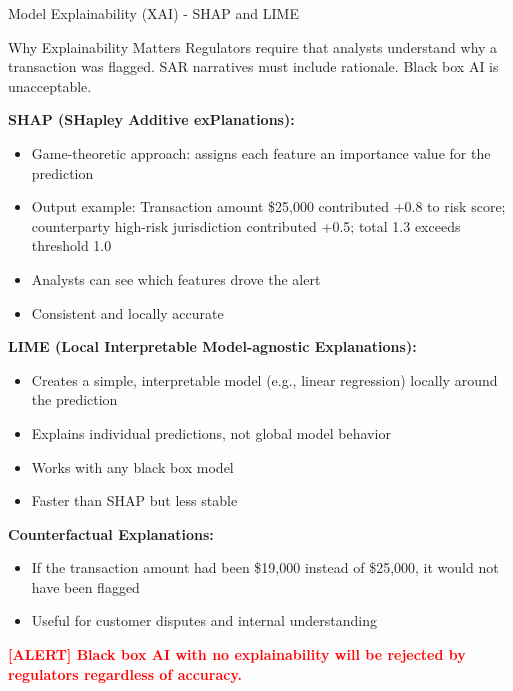 \documentclass[11pt,a4paper]{beamer}
\newcommand{\redflag}[1]{\textcolor{red}{\textbf{[ALERT] #1}}}
\begin{document}
	\begin{frame}{Model Explainability (XAI) - SHAP and LIME}
		\begin{block}{Why Explainability Matters}
			Regulators require that analysts understand why a transaction was flagged. SAR narratives must include rationale. Black box AI is unacceptable.
		\end{block}
		
		\textbf{SHAP (SHapley Additive exPlanations):}
		\begin{itemize}
			\item Game-theoretic approach: assigns each feature an importance value for the prediction
			\item Output example: Transaction amount \$25,000 contributed +0.8 to risk score; counterparty high-risk jurisdiction contributed +0.5; total 1.3 exceeds threshold 1.0
			\item Analysts can see which features drove the alert
			\item Consistent and locally accurate
		\end{itemize}
		
		\textbf{LIME (Local Interpretable Model-agnostic Explanations):}
		\begin{itemize}
			\item Creates a simple, interpretable model (e.g., linear regression) locally around the prediction
			\item Explains individual predictions, not global model behavior
			\item Works with any black box model
			\item Faster than SHAP but less stable
		\end{itemize}
		
		\textbf{Counterfactual Explanations:}
		\begin{itemize}
			\item If the transaction amount had been \$19,000 instead of \$25,000, it would not have been flagged
			\item Useful for customer disputes and internal understanding
		\end{itemize}
		
		\redflag{Black box AI with no explainability will be rejected by regulators regardless of accuracy.}
	\end{frame}
	
\end{document}
